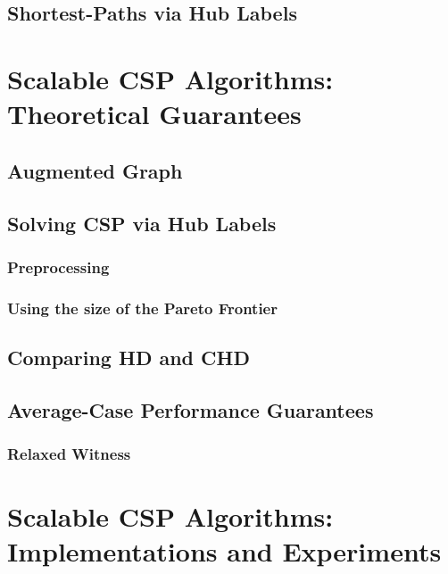 \documentclass[opre,nonblindrev]{informs3} %
\begin{document}
\subsection{Shortest-Paths via Hub Labels}
\label{ssec:hldef}


\section{Scalable CSP Algorithms: Theoretical Guarantees}
\label{sec:chd}


\subsection{Augmented Graph}
\label{ssec:aug}


\subsection{Solving CSP via Hub Labels}
\label{ssec:hlcsp}


\subsubsection{Preprocessing}
\label{sec:preproc}


\subsubsection{Using the size of the Pareto Frontier}
\label{sec:frontier}


\subsection{Comparing HD and CHD}
\label{ssec:hdvschd}


\subsection{Average-Case Performance Guarantees}
\label{sec:avg_hd}

\subsubsection{Relaxed Witness}
\label{sec:relaxed_witness}


\section{Scalable CSP Algorithms: Implementations and Experiments}
\label{sec:numeric}

\end{document}
